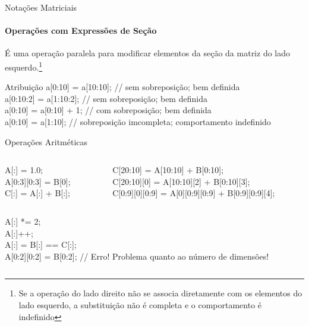 \documentclass{beamer}
\begin{document}
{
\renewcommand{\footnotesize}{\tiny} 

\begin{frame}[fragile]{Notações Matriciais}
\framesubtitle{Operações com Expressões de Seção}
    É uma operação paralela para modificar elementos da seção da matriz do lado
    esquerdo.\footnote{Se a operação do lado direito não se associa diretamente
    com os elementos do lado esquerdo, a substituição não é completa e o
    comportamento é indefinido}
\begin{scriptsize}
\begin{block}{Atribuição}
    a[0:10] = a[10:10];		// sem sobreposição; bem definida \\
    a[0:10:2] = a[1:10:2];	// sem sobreposição; bem definida \\
    a[0:10] = a[0:10] + 1;	// com sobreposição; bem definida\\
    a[0:10] = a[1:10]; 		// sobreposição imcompleta; comportamento indefinido \\
\end{block}
\pause
\begin{block}{Operações Aritméticas}
\begin{columns}
\begin{column}{0.17\textwidth}
\begin{tiny}
\begin{block}{}
    A[:] = 1.0;	\\
    A[0:3][0:3] = B[0]; \\
    C[:] = A[:] + B[:];	\\
\end{block}
\end{tiny}
\end{column}
\pause
\begin{column}{0.42\textwidth}
\begin{tiny}
\begin{block}{}
    C[20:10] = A[10:10] + B[0:10]; \\
    C[20:10][0] = A[10:10][2] + B[0:10][3];	\\
    C[0:9][0][0:9] = A[0][0:9][0:9] + B[0:9][0:9][4]; \\
\end{block}
\end{tiny}
\end{column}
\end{columns}
\pause
\begin{columns}
\begin{column}{0.75\textwidth}
\begin{tiny}
\begin{block}{}
    A[:] *= 2; \\ 
    A[:]++;	\\
    A[:] = B[:] == C[:]; \\
\pause
    A[0:2][0:2] = B[0:2]; // Erro! Problema quanto ao número de dimensões!\\
\end{block}
\end{tiny}
\end{column}
\end{columns}


\end{block}
\end{scriptsize}
\end{frame}}
\end{document}
